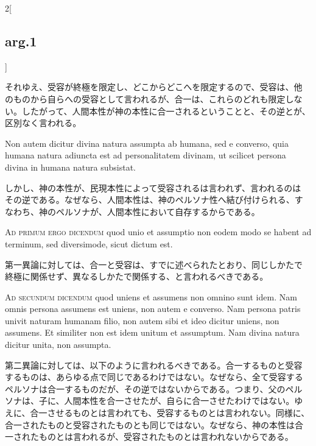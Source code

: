 \documentclass[paper=a4paper,fontsize=10pt,jafontsize=9pt,titlepage]{jlreq}
\begin{document}
\begin{paracol}{2}[\subsection{arg.1}]
\switchcolumn

それゆえ、受容が終極を限定し、どこからどこへを限定するので、受容は、他
のものから自らへの受容として言われるが、合一は、これらのどれも限定しな
い。したがって、人間本性が神の本性に合一されるということと、その逆とが、
区別なく言われる。

\switchcolumn*

Non autem dicitur divina natura assumpta ab humana, sed e converso,
quia humana natura adiuncta est ad personalitatem divinam, ut scilicet
persona divina in humana natura subsistat.

\switchcolumn

しかし、神の本性が、民現本性によって受容されるは言われず、言われるのは
その逆である。なぜなら、人間本性は、神のペルソナ性へ結び付けられる、す
なわち、神のペルソナが、人間本性において自存するからである。

\switchcolumn*[\subsection{ad.1}]

{\scshape Ad primum ergo dicendum} quod unio et assumptio non eodem
modo se habent ad terminum, sed diversimode, sicut dictum est.

\switchcolumn

第一異論に対しては、合一と受容は、すでに述べられたとおり、同じしかたで
終極に関係せず、異なるしかたで関係する、と言われるべきである。

\switchcolumn*[\subsection{ad.2}]

{\scshape Ad secundum dicendum} quod uniens et assumens non omnino
sunt idem. Nam omnis persona assumens est uniens, non autem e
converso. Nam persona patris univit naturam humanam filio, non autem
sibi et ideo dicitur uniens, non assumens. Et similiter non est idem
unitum et assumptum. Nam divina natura dicitur unita, non assumpta.

\switchcolumn

第二異論に対しては、以下のように言われるべきである。合一するものと受容
するものは、あらゆる点で同じであるわけではない。なぜなら、全て受容する
ペルソナは合一するものだが、その逆ではないからである。つまり、父のペル
ソナは、子に、人間本性を合一させたが、自らに合一させたわけではない。ゆ
えに、合一させるものとは言われても、受容するものとは言われない。同様に、
合一されたものと受容されたものとも同じではない。なぜなら、神の本性は合
一されたものとは言われるが、受容されたものとは言われないからである。


\end{paracol}
\end{document}
